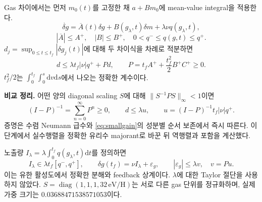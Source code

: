 \documentclass[11pt,a4paper]{article}
\numberwithin{equation}{section}
\newcommand{\dd}{\mathrm d}\newcommand{\HH}{\mathrm{HH}}\newcommand{\eV}{\mathrm{eV}}
\begin{document}
Gas 차이에서는 먼저 $m_0(t)$를 고정한 채 $a+B m_0$에 mean-value integral을 적용한다.
\begin{equation}
 \dot{\delta g}=\overline A(t)\delta g+B(g_\lambda,t)\delta m+\lambda\nu q(g_\lambda,t),
\end{equation}
\begin{equation}
 |\overline A|\le A^+,\quad |B|\le B^+,\quad
 0<q^-\le q(g,t)\le q^+.
\end{equation}
$d_j=\sup_{0\le t\le t_f}|\delta g_j(t)|$에 대해 두 차이식을 차례로 적분하면
\begin{equation}
 d\le\lambda t_f|\nu|q^++Pd,\qquad
 P=t_fA^++\frac{t_f^2}{2}B^+C^+\ge0.
 \label{eq:smallgain}
\end{equation}
$t_f^2/2$는 $\int_0^{t_f}\int_0^s\dd v\dd s$에서 나오는 정확한 계수이다.

\textbf{비교 정리.} 어떤 양의 diagonal scaling $S$에 대해 $\|S^{-1}PS\|_\infty<1$이면
\begin{equation}
 (I-P)^{-1}=\sum_{n=0}^\infty P^n\ge0,\qquad
 d\le\lambda u,\qquad u=(I-P)^{-1}t_f|\nu|q^+.
 \label{eq:ubound}
\end{equation}
증명은 수렴 Neumann 급수와 \eqref{eq:smallgain}의 성분별 순서 보존에서 즉시 따른다. 이 단계에서 실수행렬을 정확한 유리수 majorant로 바꾼 뒤 역행렬과 포함을 계산했다.

노출량 $I_\lambda=\lambda\int_0^{t_f}q(g_\lambda,t)\dd t$를 정의하면
\begin{equation}
 I_\lambda\in\lambda t_f[q^-,q^+],\qquad
 \delta g(t_f)=\nu I_\lambda+\varepsilon_g,\qquad
 |\varepsilon_g|\le\lambda v,\quad v=Pu.
 \label{eq:exposure}
\end{equation}
이는 유한 활성도에서 정확한 분해와 feedback 상계이다. $\lambda$에 대한 Taylor 절단을 사용하지 않았다. $S=\operatorname{diag}(1,1,1,32\,\eV/\mathrm H)$는 서로 다른 gas 단위를 정규화하며, 실제 가중 크기는 $0.03688471538571053$이다.

\newpage
\end{document}
